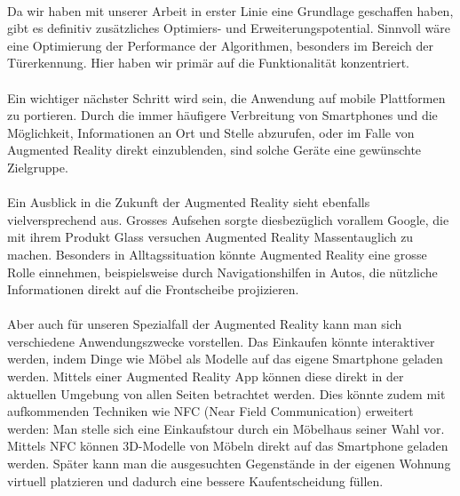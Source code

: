 \noindent\paragraph{}
Da wir haben mit unserer Arbeit in erster Linie eine Grundlage geschaffen haben, gibt es definitiv zusätzliches Optimiers- und Erweiterungspotential. Sinnvoll wäre eine Optimierung der Performance der Algorithmen, besonders im Bereich der Türerkennung. Hier haben wir primär auf die Funktionalität konzentriert. 
\noindent\paragraph{}
Ein wichtiger nächster Schritt wird sein, die Anwendung auf mobile Plattformen zu portieren. Durch die immer häufigere Verbreitung von Smartphones und die Möglichkeit, Informationen an Ort und Stelle abzurufen, oder im Falle von Augmented Reality direkt einzublenden, sind solche Geräte eine gewünschte Zielgruppe. 
\noindent\paragraph{}
Ein Ausblick in die Zukunft der Augmented Reality sieht ebenfalls vielversprechend aus. Grosses Aufsehen sorgte diesbezüglich vorallem Google, die mit ihrem Produkt Glass versuchen Augmented Reality Massentauglich zu machen. Besonders in Alltagssituation könnte Augmented Reality eine grosse Rolle einnehmen, beispielsweise durch Navigationshilfen in Autos, die nützliche Informationen direkt auf die Frontscheibe projizieren.
\noindent\paragraph{}
Aber auch für unseren Spezialfall der Augmented Reality kann man sich verschiedene Anwendungszwecke vorstellen. Das Einkaufen könnte interaktiver werden, indem Dinge wie Möbel als Modelle auf das eigene Smartphone geladen werden. Mittels einer Augmented Reality App können diese direkt in der aktuellen Umgebung von allen Seiten betrachtet werden. Dies könnte zudem mit aufkommenden Techniken wie NFC (Near Field Communication) erweitert werden: Man stelle sich eine Einkaufstour durch ein Möbelhaus seiner Wahl vor. Mittels NFC können 3D-Modelle von Möbeln direkt auf das Smartphone geladen werden. Später kann man die ausgesuchten Gegenstände in der eigenen Wohnung virtuell platzieren und dadurch eine bessere Kaufentscheidung füllen.